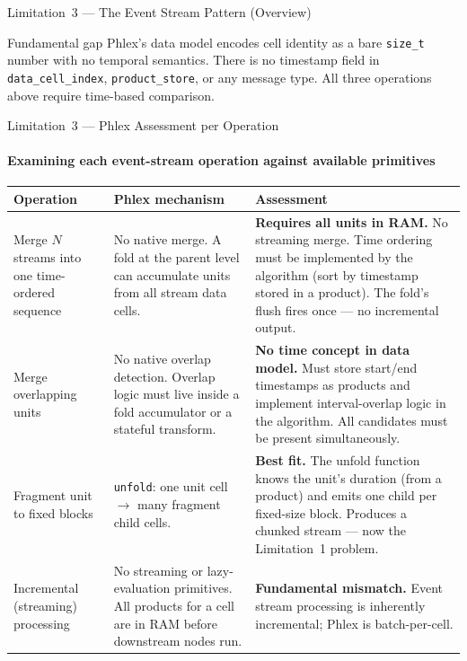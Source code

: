 \documentclass[aspectratio=169,10pt]{beamer}
\newcommand{\good}[1]{\textcolor{green!50!black}{\textbf{#1}}}
\newcommand{\bad}[1]{\textcolor{red!70!black}{\textbf{#1}}}
\newcommand{\code}[1]{\texttt{\small #1}}
\begin{document}
\begin{frame}{Limitation~3 --- The Event Stream Pattern (Overview)}
  \medskip
  \begin{alertblock}{Fundamental gap}
    Phlex's data model encodes cell identity as a bare \code{size\_t}
    number with no temporal semantics.  There is no timestamp field in
    \code{data\_cell\_index}, \code{product\_store}, or any message type.
    All three operations above require time-based comparison.
  \end{alertblock}
\end{frame}


\begin{frame}[fragile]{Limitation~3 --- Phlex Assessment per Operation}
  \framesubtitle{Examining each event-stream operation against available primitives}

  \small
  \begin{tabular}{@{}p{}p{}p{}@{}}
    \toprule
    \textbf{Operation} & \textbf{Phlex mechanism} & \textbf{Assessment} \\
    \midrule
    Merge $N$ streams into one time-ordered sequence
    &
    No native merge.  A fold at the parent level can accumulate units
    from all stream data cells.
    &
    \bad{Requires all units in RAM.}
    No streaming merge.
    Time ordering must be implemented by the algorithm (sort by timestamp
    stored in a product).
    The fold's flush fires once --- no incremental output.
    \\[4pt]
    \midrule
    Merge overlapping units
    &
    No native overlap detection.
    Overlap logic must live inside a fold accumulator or a stateful
    transform.
    &
    \bad{No time concept in data model.}
    Must store start/end timestamps as products and implement
    interval-overlap logic in the algorithm.
    All candidates must be present simultaneously.
    \\[4pt]
    \midrule
    Fragment unit to fixed blocks
    &
    \code{unfold}: one unit cell $\to$ many fragment child cells.
    &
    \good{Best fit.}
    The unfold function knows the unit's duration (from a product)
    and emits one child per fixed-size block.
    Produces a chunked stream --- now the Limitation~1 problem.
    \\[4pt]
    \midrule
    Incremental (streaming) processing
    &
    No streaming or lazy-evaluation primitives.
    All products for a cell are in RAM before downstream nodes run.
    &
    \bad{Fundamental mismatch.}
    Event stream processing is inherently incremental; Phlex is
    batch-per-cell.
    \\
    \bottomrule
  \end{tabular}
\end{frame}
\end{document}

